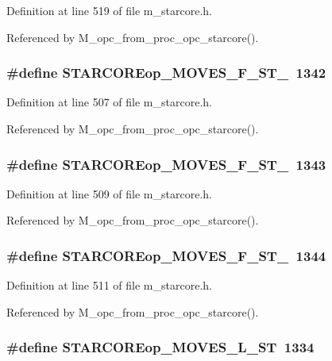 Definition at line 519 of file m\_\-starcore.h.

Referenced by M\_\-opc\_\-from\_\-proc\_\-opc\_\-starcore().
\subsubsection{\setlength{\rightskip}{0pt plus 5cm}\#define STARCOREop\_\-MOVES\_\-F\_\-ST\_~1342}\label{m__starcore_8h_3c3bf63c093d9226c1a39e18f11f9f6c}




Definition at line 507 of file m\_\-starcore.h.

Referenced by M\_\-opc\_\-from\_\-proc\_\-opc\_\-starcore().
\subsubsection{\setlength{\rightskip}{0pt plus 5cm}\#define STARCOREop\_\-MOVES\_\-F\_\-ST\_~1343}\label{m__starcore_8h_68baa837faca72e7ce592bf388fbc175}




Definition at line 509 of file m\_\-starcore.h.

Referenced by M\_\-opc\_\-from\_\-proc\_\-opc\_\-starcore().
\subsubsection{\setlength{\rightskip}{0pt plus 5cm}\#define STARCOREop\_\-MOVES\_\-F\_\-ST\_~1344}\label{m__starcore_8h_37325f7ac3f2a9f8f65cf7bda300bb83}




Definition at line 511 of file m\_\-starcore.h.

Referenced by M\_\-opc\_\-from\_\-proc\_\-opc\_\-starcore().
\subsubsection{\setlength{\rightskip}{0pt plus 5cm}\#define STARCOREop\_\-MOVES\_\-L\_\-ST~1334}\label{m__starcore_8h_7b11ff570b0c402f562271b95c04cce3}




